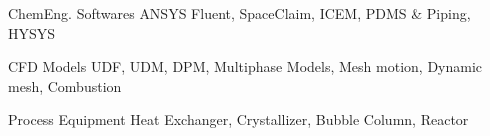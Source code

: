 \bigskip

\cvskill
    {ChemEng. Softwares}
    {ANSYS Fluent, SpaceClaim, ICEM, PDMS \& Piping, HYSYS}


\cvskill
    {CFD Models}
    {UDF, UDM, DPM, Multiphase Models, Mesh motion, Dynamic mesh, Combustion}


\cvskill
    {Process Equipment}
    {Heat Exchanger, Crystallizer, Bubble Column, Reactor}

